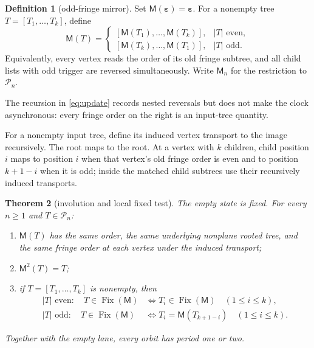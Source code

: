 \documentclass[10pt,a4paper]{amsart}
\newtheorem{theorem}{Theorem}[section]
\theoremstyle{definition}
\newtheorem{definition}[theorem]{Definition}
\theoremstyle{remark}
\newcommand{\PT}{\mathcal P}
\newcommand{\Fix}{\operatorname{Fix}}
\newcommand{\M}{\mathsf M}
\newcommand{\eps}{\boldsymbol\varepsilon}
\begin{document}
\begin{definition}[odd-fringe mirror]\label{def:update}
Set $\M(\eps)=\eps$.  For a nonempty tree $T=[T_1,\ldots,T_k]$, define
\begin{equation}\label{eq:update}
\M(T)=
\begin{cases}
[\M(T_1),\ldots,\M(T_k)],& |T|\text{ even},\\
[\M(T_k),\ldots,\M(T_1)],& |T|\text{ odd}.
\end{cases}
\end{equation}
Equivalently, every vertex reads the order of its old fringe subtree, and
all child lists with odd trigger are reversed simultaneously.  Write
$\M_n$ for the restriction to $\PT_n$.
\end{definition}

The recursion in \eqref{eq:update} records nested reversals but does not make
the clock asynchronous: every fringe order on the right is an input-tree
quantity.

For a nonempty input tree, define its induced vertex transport to the image
recursively.  The root maps to the root.  At a vertex with \(k\) children,
child position \(i\) maps to position \(i\) when that vertex's old fringe
order is even and to position \(k+1-i\) when it is odd; inside the matched
child subtrees use their recursively induced transports.

\begin{theorem}[involution and local fixed test]\label{thm:involution}
The empty state is fixed.  For every \(n\ge1\) and \(T\in\PT_n\):
\begin{enumerate}
\item $\M(T)$ has the same order, the same underlying nonplane rooted tree,
  and the same fringe order at each vertex under the induced transport;
\item $\M^2(T)=T$;
\item if $T=[T_1,\ldots,T_k]$ is nonempty, then
\begin{align}
|T|\text{ even}:\quad
 T\in\Fix(\M)&\Longleftrightarrow
 T_i\in\Fix(\M)\quad(1\leq i\leq k),                 \label{eq:even-fixed}\\
|T|\text{ odd}:\quad
 T\in\Fix(\M)&\Longleftrightarrow
 T_i=\M(T_{k+1-i})\quad(1\leq i\leq k).              \label{eq:odd-fixed}
\end{align}
\end{enumerate}
Together with the empty lane, every orbit has period one or two.
\end{theorem}
\end{document}
